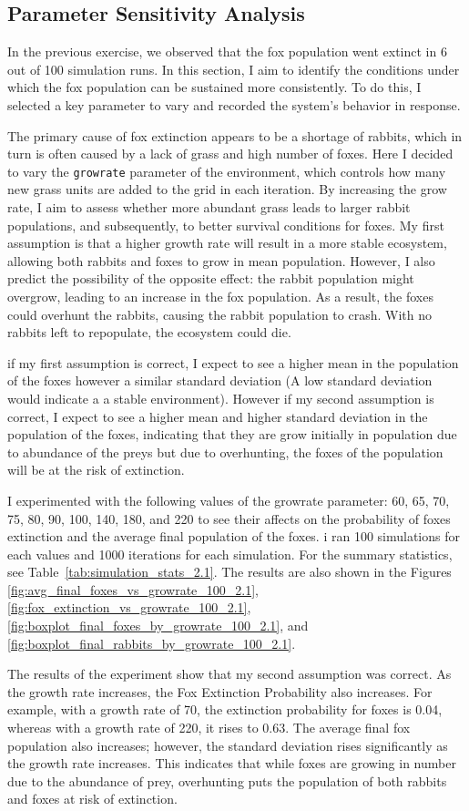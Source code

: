 \subsection{Parameter Sensitivity Analysis }

In the previous exercise, we observed that the fox population went extinct in 6 out of 100 simulation runs. In this section, I aim to identify the conditions under which the fox population can be sustained more consistently. To do this, I selected a key parameter to vary and recorded the system's behavior in response.

The primary cause of fox extinction appears to be a shortage of rabbits, which in turn is often caused by a lack of grass and high number of foxes. Here I decided to vary the \texttt{growrate} parameter of the environment, which controls how many new grass units are added to the grid in each iteration. By increasing the grow rate, I aim to assess whether more abundant grass leads to larger rabbit populations, and subsequently, to better survival conditions for foxes.
My first assumption is that a higher growth rate will result in a more stable ecosystem, allowing both rabbits and foxes to grow in mean population. However, I also predict the possibility of the opposite effect: the rabbit population might overgrow, leading to an increase in the fox population. As a result, the foxes could overhunt the rabbits, causing the rabbit population to crash. With no rabbits left to repopulate, the ecosystem could die.

if my first assumption is correct, I expect to see a higher mean in the population of the foxes however a similar standard deviation (A low standard deviation would indicate a a stable environment). However if my second assumption is correct, I expect to see a higher mean and higher standard deviation in the population of the foxes, indicating that they are grow initially in population due to abundance of the preys but due to overhunting, the foxes of the population will be at the risk of extinction.

I experimented with the following values of the growrate parameter: 60, 65, 70, 75, 80, 90, 100, 140, 180, and 220 to
 see their affects on the probability of foxes extinction and the average final population of the foxes. i ran 100
  simulations for each values and 1000 iterations for each simulation.
   For the summary statistics, see Table~\ref{tab:simulation_stats_2.1}. 
   The results are also shown in the Figures \ref{fig:avg_final_foxes_vs_growrate_100_2.1}, \ref{fig:fox_extinction_vs_growrate_100_2.1},
   \ref{fig:boxplot_final_foxes_by_growrate_100_2.1}, and \ref{fig:boxplot_final_rabbits_by_growrate_100_2.1}.

   The results of the experiment show that my second assumption was correct. As the growth rate increases, the Fox Extinction Probability also increases. For example, with a growth rate of 70, the extinction probability for foxes is 0.04, whereas with a growth rate of 220, it rises to 0.63.
   The average final fox population also increases; however, the standard deviation rises significantly as the growth rate increases. This indicates that while foxes are growing in number due to the abundance of prey, overhunting puts the population of both rabbits and foxes at risk of extinction.